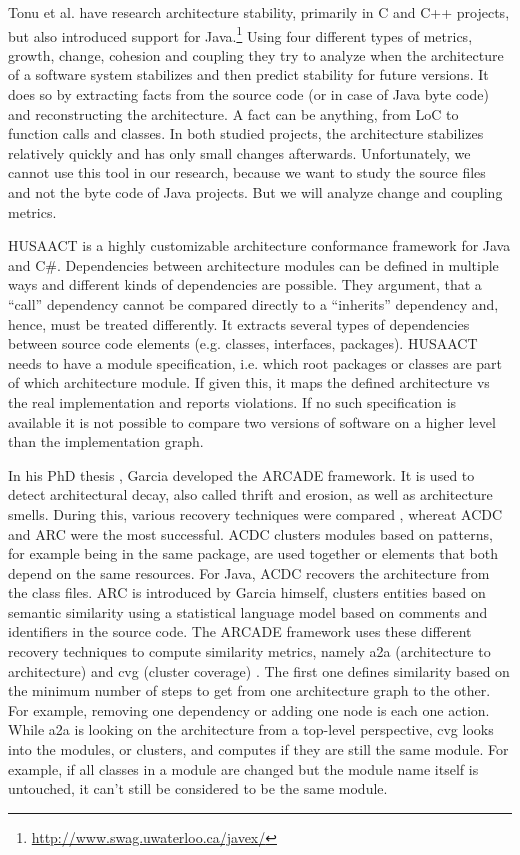 \documentclass[conference]{IEEEtran}
\begin{document}
Tonu et al. \cite{Swag} have research architecture stability, primarily in C and C++ projects, but also introduced support for Java.\footnote{\url{http://www.swag.uwaterloo.ca/javex/}} Using four different types of metrics, growth, change, cohesion and coupling they try to analyze when the architecture of a software system stabilizes and then predict stability for future versions. It does so by extracting facts from the source code (or in case of Java byte code) and reconstructing the architecture. A fact can be anything, from LoC to function calls and classes. 
In both studied projects, the architecture stabilizes relatively quickly and has only small changes afterwards. Unfortunately, we cannot use this tool in our research, because we want to study the source files and not the byte code of Java projects. But we will analyze change and coupling metrics.

HUSAACT \cite{Husacct1,Husacct2} is a highly customizable architecture conformance framework for Java and C\#. Dependencies between architecture modules can be defined in multiple ways and different kinds of dependencies are possible. They argument, that a ``call'' dependency cannot be compared directly to a ``inherits'' dependency and, hence, must be treated differently. 
It extracts several types of dependencies between source code elements (e.g. classes, interfaces, packages). HUSAACT needs to have a module specification, i.e. which root packages or classes are part of which architecture module. If given this, it maps the defined architecture vs the real implementation and reports violations.
If no such specification is available it is not possible to compare two versions of software on a higher level than the implementation graph. 

In his PhD thesis \cite{arcade-thesis}, Garcia developed the ARCADE framework. It is used to detect architectural decay, also called thrift and erosion, as well as architecture smells. During this, various recovery techniques were compared \cite{arcRec-comparison}, whereat ACDC \cite{ACDC} and ARC were the most successful. 
ACDC clusters modules based on patterns, for example being in the same package, are used together or elements that both depend on the same resources. For Java, ACDC recovers the architecture from the class files. ARC is introduced by Garcia himself, clusters entities based on semantic similarity using a statistical language model based on comments and identifiers in the source code.
The ARCADE framework uses these different recovery techniques to compute similarity metrics, namely a2a (architecture to architecture) and cvg (cluster coverage) \cite{Arcade}. The first one defines similarity based on the minimum number of steps to get from one architecture graph to the other. For example, removing one dependency or adding one node is each one action. While a2a is looking on the architecture from a top-level perspective, cvg looks into the modules, or clusters, and computes if they are still the same module. For example, if all classes in a module are changed but the module name itself is untouched, it can't still be considered to be the same module.
\end{document}
